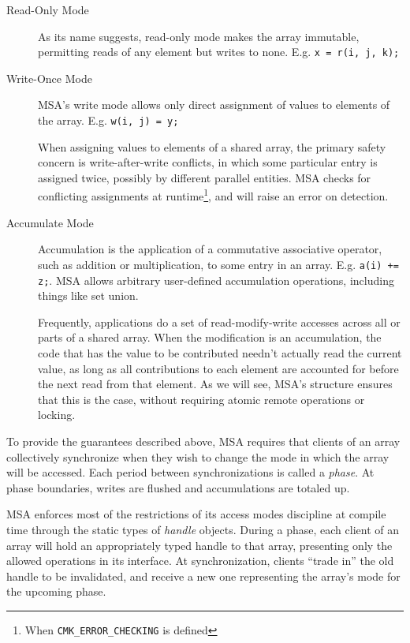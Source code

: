\begin{description}
\item[Read-Only Mode]
As its name suggests, read-only mode makes the array immutable,
permitting reads of any element but writes to none.
E.g. {\tt x = r(i, j, k);}

\item[Write-Once Mode]
MSA's write mode allows only direct assignment of values to elements
of the array. E.g. {\tt w(i, j) = y;}

When assigning values to elements of a shared array, the primary
safety concern is write-after-write conflicts, in which some
particular entry is assigned twice, possibly by different parallel
entities. MSA checks for conflicting assignments at
runtime\footnote{When {\tt CMK\_ERROR\_CHECKING} is defined}, and will
raise an error on detection.

\item[Accumulate Mode]

Accumulation is the application of a commutative associative operator,
such as addition or multiplication, to some entry in an
array. E.g. {\tt a(i) += z;}. MSA allows arbitrary user-defined
accumulation operations, including things like set union.

Frequently, applications do a set of read-modify-write accesses across
all or parts of a shared array. When the modification is an
accumulation, the code that has the value to be contributed needn't
actually read the current value, as long as all contributions to each
element are accounted for before the next read from that element. As
we will see, MSA's structure ensures that this is the case, without
requiring atomic remote operations or locking.

\end{description}

To provide the guarantees described above, MSA requires that clients
of an array collectively synchronize when they wish to change the mode
in which the array will be accessed. Each period between
synchronizations is called a \emph{phase}. At phase boundaries, writes
are flushed and accumulations are totaled up.

MSA enforces most of the restrictions of its access modes discipline
at compile time through the static types of \emph{handle}
objects. During a phase, each client of an array will hold an
appropriately typed handle to that array, presenting only the allowed
operations in its interface. At synchronization, clients ``trade in''
the old handle to be invalidated, and receive a new one representing
the array's mode for the upcoming phase.

